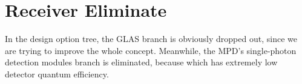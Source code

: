 \section{Receiver Eliminate}
\label{pruneReceiver}
In the design option tree, the GLAS branch is obviously dropped out, since we are trying to improve the whole concept. Meanwhile, the \ac{MPD}'s single-photon detection modules branch is eliminated, because which has extremely low detector quantum efficiency. 